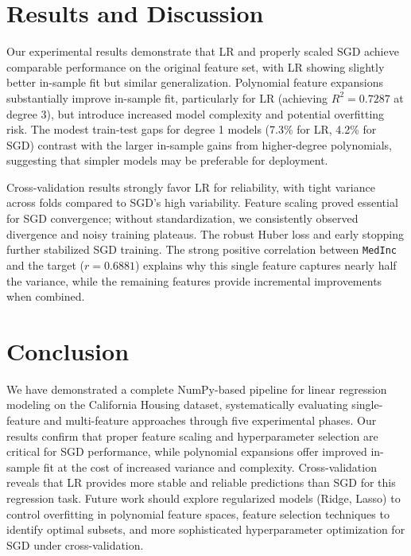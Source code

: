 \documentclass[runningheads]{llncs}
\begin{document}
\section{Results and Discussion}
Our experimental results demonstrate that LR and properly scaled SGD achieve comparable performance on the original feature set, with LR showing slightly better in-sample fit but similar generalization. Polynomial feature expansions substantially improve in-sample fit, particularly for LR (achieving $R^2 = 0.7287$ at degree 3), but introduce increased model complexity and potential overfitting risk. The modest train-test gaps for degree 1 models (7.3\% for LR, 4.2\% for SGD) contrast with the larger in-sample gains from higher-degree polynomials, suggesting that simpler models may be preferable for deployment.

Cross-validation results strongly favor LR for reliability, with tight variance across folds compared to SGD's high variability. Feature scaling proved essential for SGD convergence; without standardization, we consistently observed divergence and noisy training plateaus. The robust Huber loss and early stopping further stabilized SGD training. The strong positive correlation between \texttt{MedInc} and the target ($r = 0.6881$) explains why this single feature captures nearly half the variance, while the remaining features provide incremental improvements when combined.

\section{Conclusion}
We have demonstrated a complete NumPy-based pipeline for linear regression modeling on the California Housing dataset, systematically evaluating single-feature and multi-feature approaches through five experimental phases. Our results confirm that proper feature scaling and hyperparameter selection are critical for SGD performance, while polynomial expansions offer improved in-sample fit at the cost of increased variance and complexity. Cross-validation reveals that LR provides more stable and reliable predictions than SGD for this regression task. Future work should explore regularized models (Ridge, Lasso) to control overfitting in polynomial feature spaces, feature selection techniques to identify optimal subsets, and more sophisticated hyperparameter optimization for SGD under cross-validation.
\end{document}
